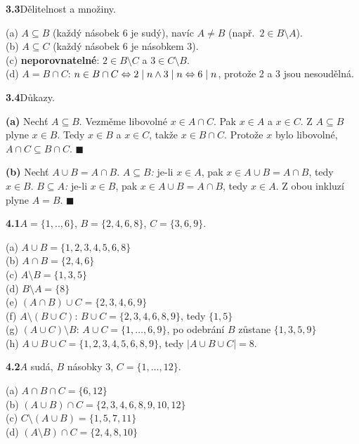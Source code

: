 \documentclass[11pt,a4paper]{article}
\newcommand{\zad}[2]{\par\Needspace*{4cm}\vspace{1.1em}\noindent\textcolor{accent}{\sffamily\bfseries #1}\enspace #2\par}
\begin{document}
\zad{3.3}{Dělitelnost a množiny.}
\begin{reseni}
(a) $A\subseteq B$ (každý násobek 6 je sudý), navíc $A\neq B$ (např.\ $2\in B\setminus A$).\\
(b) $A\subseteq C$ (každý násobek 6 je násobkem 3).\\
(c) \textbf{neporovnatelné}: $2\in B\setminus C$ a $3\in C\setminus B$.\\
(d) $A=B\cap C$: $n\in B\cap C\Leftrightarrow 2\mathrel{\mid} n\land 3\mathrel{\mid} n\Leftrightarrow 6\mathrel{\mid} n$, protože 2 a 3 jsou nesoudělná.
\end{reseni}

\zad{3.4}{Důkazy.}
\begin{reseni}
\textbf{(a)} Nechť $A\subseteq B$. Vezměme libovolné $x\in A\cap C$. Pak $x\in A$ a $x\in C$. Z $A\subseteq B$ plyne $x\in B$. Tedy $x\in B$ a $x\in C$, takže $x\in B\cap C$. Protože $x$ bylo libovolné, $A\cap C\subseteq B\cap C$. \hfill$\blacksquare$

\smallskip
\textbf{(b)} Nechť $A\cup B=A\cap B$. \emph{$A\subseteq B$:} je-li $x\in A$, pak $x\in A\cup B=A\cap B$, tedy $x\in B$. \emph{$B\subseteq A$:} je-li $x\in B$, pak $x\in A\cup B=A\cap B$, tedy $x\in A$. Z obou inkluzí plyne $A=B$. \hfill$\blacksquare$
\end{reseni}


\zad{4.1}{$A=\{1,..,6\}$, $B=\{2,4,6,8\}$, $C=\{3,6,9\}$.}
\begin{reseni}
(a) $A\cup B=\{1,2,3,4,5,6,8\}$\\
(b) $A\cap B=\{2,4,6\}$\\
(c) $A\setminus B=\{1,3,5\}$\\
(d) $B\setminus A=\{8\}$\\
(e) $(A\cap B)\cup C=\{2,3,4,6,9\}$\\
(f) $A\setminus(B\cup C)$: $B\cup C=\{2,3,4,6,8,9\}$, tedy $\{1,5\}$\\
(g) $(A\cup C)\setminus B$: $A\cup C=\{1,\dots,6,9\}$, po odebrání $B$ zůstane $\{1,3,5,9\}$\\
(h) $A\cup B\cup C=\{1,2,3,4,5,6,8,9\}$, tedy $|A\cup B\cup C|=8$.
\end{reseni}

\zad{4.2}{$A$ sudá, $B$ násobky 3, $C=\{1,\dots,12\}$.}
\begin{reseni}
(a) $A\cap B\cap C=\{6,12\}$\\
(b) $(A\cup B)\cap C=\{2,3,4,6,8,9,10,12\}$\\
(c) $C\setminus(A\cup B)=\{1,5,7,11\}$\\
(d) $(A\setminus B)\cap C=\{2,4,8,10\}$
\end{reseni}
\end{document}
